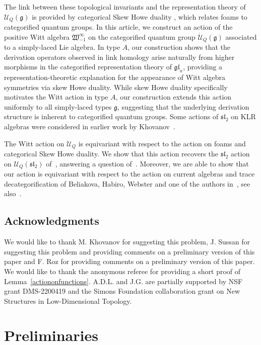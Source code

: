 \documentclass{amsart}
\numberwithin{equation}{section}
\theoremstyle{definition}
\newcommand{\Ucat}{\mathcal{U}_Q}
\newcommand{\witt}{{\mathfrak{W}}}
\newcommand{\ourwitt}{{\witt_{-1}^{\infty}}}
\begin{document}
The link between these topological invariants and the representation theory of $\mathcal{U}_{Q}(\mathfrak{g})$ is provided by categorical Skew Howe duality \cite{CKM,CautisKam-coherent,Lauda2015,QR}, which relates foams to categorified quantum groups. In this article, we construct an action of the positive Witt algebra $\ourwitt$ on the categorified quantum group $\dot{\mathcal{U}}_Q(\mathfrak{g})$ associated to a simply-laced Lie algebra. In type $A$, our construction shows that the derivation operators observed in link homology arise naturally from higher morphisms in the categorified representation theory of $\mathfrak{gl}_n$, providing a representation-theoretic explanation for the appearance of Witt algebra symmetries via skew Howe duality. While skew Howe duality specifically motivates the Witt action in type $A$, our construction extends this action uniformly to all simply-laced types $\mathfrak{g}$, suggesting that the underlying derivation structure is inherent to categorified quantum groups. Some actions of $\mathfrak{sl}_2$ on KLR algebras were considered in earlier work by Khovanov~\cite{KhovNote}. 


The Witt action on $\Ucat$ is equivariant with respect to the action on foams and categorical Skew Howe duality. We show that this action recovers the $\mathfrak{sl}_2$ action on $\Ucat(\mathfrak{sl}_2)$ of~\cite{Elias_2023}, answering a question of~\cite{qi2024symmetriesmathfrakglnfoams}. Moreover, we are able to show that our action is equivariant with respect to the action on current algebras and trace decategorification of Beliakova, Habiro, Webster and one of the authors in~\cite{Lau-trace3}, see also~\cite{Beliakova_2016,Lau-trace2}.

  
 

\subsection*{Acknowledgments}
We would like to thank M. Khovanov for suggesting this problem, J. Sussan for suggesting this problem and providing comments on a preliminary version of this paper and F. Roz for providing comments on a preliminary version of this paper. We would like to thank the anonymous referee for providing a short proof of Lemma~\ref{actiononfunctions}. A.D.L. and J.G. are partially supported by NSF grant DMS-2200419 and the Simons Foundation collaboration grant on New Structures in Low-Dimensional Topology. 
 

\section{Preliminaries}
\end{document}
